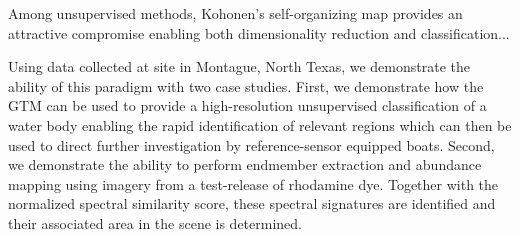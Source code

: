 \documentclass{article}
\begin{document}
Among unsupervised methods, Kohonen's self-organizing map provides an attractive compromise enabling both dimensionality reduction and classification...




Using data collected at site in Montague, North Texas, we demonstrate the ability of this paradigm with two case studies. First, we demonstrate how the GTM can be used to provide a high-resolution unsupervised classification of a water body enabling the rapid identification of relevant regions which can then be used to direct further investigation by reference-sensor equipped boats. Second, we demonstrate the ability to perform endmember extraction and abundance mapping using imagery from a test-release of rhodamine dye. Together with the normalized spectral similarity score, these spectral signatures are identified and their associated area in the scene is determined.






\end{document}
